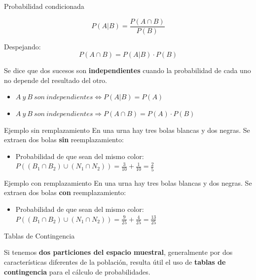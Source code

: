 \documentclass[11pt,handout]{beamer}
\begin{document}
\begin{frame}{Probabilidad condicionada}
\begin{block}{}
$$P(A|B)=\dfrac{P(A\cap B)}{P(B)}$$
\end{block}

\pause
Despejando:
$$P(A\cap B) = P(A|B)\cdot P(B)$$

\pause

Se dice que dos sucesos son \textbf{independientes} cuando la probabilidad de cada uno no depende del resultado del otro. 




\begin{itemize}[<+->]

\item $A\ y \ B\ son \ independientes \Longleftrightarrow P(A|B)=P(A)$

\item $A\ y \ B\ son \ independientes \Rightarrow P(A \cap B)=P(A) \cdot P(B)$

\end{itemize}
\end{frame}

\begin{frame}{Ejemplo sin remplazamiento}
En una urna hay tres bolas blancas y dos negras. Se extraen dos bolas \textbf{sin} reemplazamiento:

\pause
\begin{itemize}[<+->]
\item Probabilidad de que sean del mismo color: \\
\pause
$P((B_1\cap B_2)\cup (N_1\cap N_2))=\frac{3}{10}+\frac{1}{10}=\frac{2}{5}$
\end{itemize}

\end{frame}

\begin{frame}{Ejemplo con remplazamiento}
En una urna hay tres bolas blancas y dos negras. Se extraen dos bolas \textbf{con} reemplazamiento:

\pause
\begin{itemize}
\item Probabilidad de que sean del mismo color: \\
\pause
$P((B_1\cap B_2)\cup (N_1\cap N_2))=\frac{9}{25}+\frac{4}{25}=\frac{13}{25}$
\end{itemize}

\end{frame}

\begin{frame}{Tablas de Contingencia}
\begin{block}{}
Si tenemos \textbf{dos particiones del espacio muestral}, generalmente por dos características diferentes de la población, resulta útil el uso de \textbf{tablas de contingencia} para el cálculo de probabilidades.
\end{block}
\end{frame}
\end{document}
